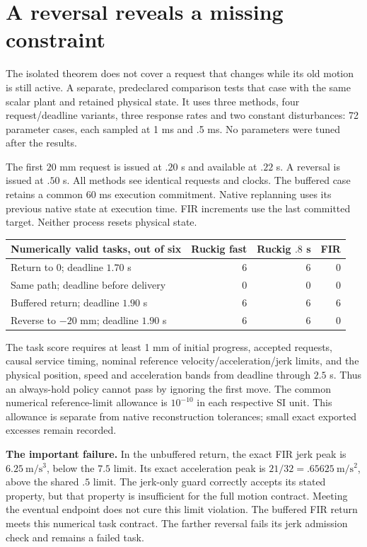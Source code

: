 \section{A reversal reveals a missing constraint}\label{movinggoal}
The isolated theorem does not cover a request that changes while its old motion
is still active. A separate, predeclared comparison tests that case with the
same scalar plant and retained physical state. It uses three methods, four
request/deadline variants, three response rates and two constant disturbances:
72 parameter cases, each sampled at 1 ms and .5 ms. No parameters were tuned
after the results.

The first $20$ mm request is issued at $.20$ s and available at $.22$ s.
A reversal is issued at $.50$ s. All methods see identical requests and clocks.
The buffered case retains a common 60 ms execution commitment. Native replanning
uses its previous native state at execution time. FIR increments use the last
committed target. Neither process resets physical state.

\begin{center}\small
\begin{tabular}{@{}lrrr@{}}\toprule
Numerically valid tasks, out of six & Ruckig fast & Ruckig $.8$ s & FIR\\\midrule
Return to $0$; deadline $1.70$ s & 6 & 6 & 0\\
Same path; deadline before delivery & 0 & 0 & 0\\
Buffered return; deadline $1.90$ s & 6 & 6 & 6\\
Reverse to $-20$ mm; deadline $1.90$ s & 6 & 6 & 0\\\bottomrule
\end{tabular}
\end{center}

The task score requires at least 1 mm of initial progress, accepted requests,
causal service timing, nominal reference velocity/acceleration/jerk limits, and
the physical position, speed and acceleration bands from deadline through
$2.5$ s. Thus an always-hold policy cannot pass by ignoring the first move.
The common numerical reference-limit allowance is $10^{-10}$ in each respective
SI unit. This allowance is separate from native reconstruction tolerances;
small exact exported excesses remain recorded.

\textbf{The important failure.} In the unbuffered return, the exact FIR jerk peak
is $6.25\ \mathrm{m/s^3}$, below the $7.5$ limit. Its exact acceleration peak is
$21/32=.65625\ \mathrm{m/s^2}$, above the shared $.5$ limit. The jerk-only guard
correctly accepts its stated property, but that property is insufficient for
the full motion contract. Meeting the eventual endpoint does not cure this
limit violation. The buffered FIR return meets this numerical task contract.
The farther reversal fails its jerk admission check and remains a failed task.

